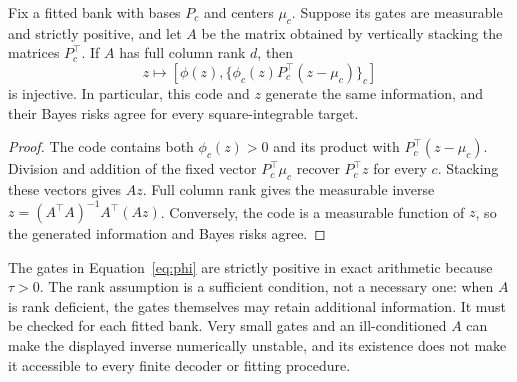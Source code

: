 \begin{proposition}
\label{prop:local-injectivity}
Fix a fitted bank with bases $P_c$ and centers $\mu_c$. Suppose its gates
are measurable and strictly positive, and let $A$ be the matrix obtained by vertically
stacking the matrices $P_c^\top$. If $A$ has full column rank $d$, then
\[
 z\longmapsto
 \left[\phi(z),\{\phi_c(z)P_c^\top(z-\mu_c)\}_c\right]
\]
is injective. In particular, this code and $z$ generate the same
information, and their Bayes risks agree for every square-integrable
target.
\end{proposition}
\begin{proof}
The code contains both $\phi_c(z)>0$ and its product with
$P_c^\top(z-\mu_c)$. Division and addition of the fixed vector
$P_c^\top\mu_c$ recover $P_c^\top z$ for every $c$. Stacking these
vectors gives $Az$. Full column rank gives the measurable inverse
$z=(A^\top A)^{-1}A^\top(Az)$. Conversely, the code is a measurable
function of $z$, so the generated information and Bayes risks agree.
\end{proof}

The gates in Equation~\eqref{eq:phi} are strictly positive in exact
arithmetic because $\tau>0$. The rank assumption is a sufficient
condition, not a necessary one: when $A$ is rank deficient, the gates
themselves may retain additional information. It must be checked for
each fitted bank. Very small gates and an ill-conditioned $A$ can make
the displayed inverse numerically unstable, and its existence does not
make it accessible to every finite decoder or fitting procedure.

